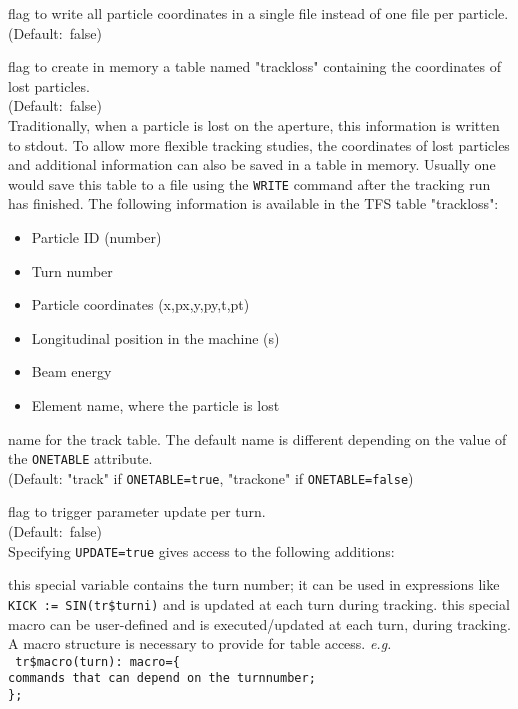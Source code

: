 \begin{madlist}
   flag to write all particle coordinates in a single
  file instead of one file per particle. \\ (Default:~false)

   flag to create in memory a table named "trackloss"
  containing the coordinates of lost particles.\\
  (Default:~false) \\
  Traditionally, when a particle is lost on the aperture, this information
  is written to stdout. To allow more flexible tracking studies, the
  coordinates of lost particles and additional information can also be
  saved in a table in memory. Usually one would save this table to a
  file using the \texttt{WRITE} command after the tracking run has
  finished. The following information is available in the TFS table
  "trackloss":          
  \begin{itemize}
  \item Particle ID (number)
  \item Turn number
  \item Particle coordinates (x,px,y,py,t,pt)
  \item Longitudinal position in the machine (s)
  \item Beam energy
  \item Element name, where the particle is lost
  \end{itemize}

   name for the track table. The default name is different
  depending on the value of the \texttt{ONETABLE} attribute. \\ 
  (Default: "track" if \texttt{ONETABLE=true}, "trackone" if \texttt{ONETABLE=false})

   flag to trigger parameter update per turn. \\  
  (Default:~false) \\
  Specifying \texttt{UPDATE=true} gives access to the following additions:   
  \begin{madlist}
     this special variable contains the turn number;
    it can be used in expressions like \texttt{KICK := SIN(tr\$turni)} and is
    updated at each turn during tracking.     
      this special macro can be
    user-defined and is executed/updated at each turn, during tracking.
    A macro structure is necessary to provide for table access.
    \textsl{e.g.} \\ 
    \texttt{
      tr\$macro(turn): macro=\{ \\
      commands that can depend on the turnnumber;\\
      \};
    } 
  \end{madlist}

\end{madlist}

